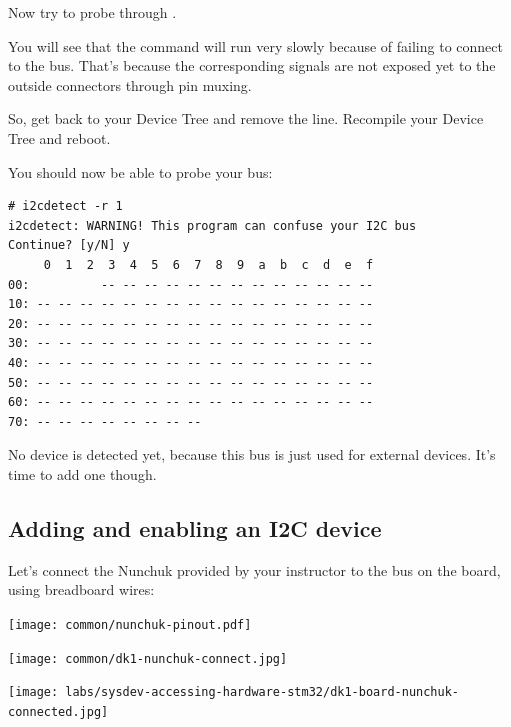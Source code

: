 Now try to probe \busname through .

You will see that the command will run very slowly because of failing to
connect to the bus. That's because the corresponding signals are
not exposed yet to the outside connectors through pin muxing.

So, get back to your Device Tree and remove the 
line. Recompile your Device Tree and reboot.

You should now be able to probe your bus:

\begin{verbatim}
# i2cdetect -r 1
i2cdetect: WARNING! This program can confuse your I2C bus
Continue? [y/N] y
     0  1  2  3  4  5  6  7  8  9  a  b  c  d  e  f
00:          -- -- -- -- -- -- -- -- -- -- -- -- --
10: -- -- -- -- -- -- -- -- -- -- -- -- -- -- -- --
20: -- -- -- -- -- -- -- -- -- -- -- -- -- -- -- --
30: -- -- -- -- -- -- -- -- -- -- -- -- -- -- -- --
40: -- -- -- -- -- -- -- -- -- -- -- -- -- -- -- --
50: -- -- -- -- -- -- -- -- -- -- -- -- -- -- -- --
60: -- -- -- -- -- -- -- -- -- -- -- -- -- -- -- --
70: -- -- -- -- -- -- -- --
\end{verbatim}

No device is detected yet, because this bus is just
used for external devices. It's time to add one though.

\subsection{Adding and enabling an I2C device}

Let's connect the Nunchuk provided by your instructor
to the \busname bus on the board, using breadboard wires:

\begin{center}
\texttt{[image: common/nunchuk-pinout.pdf]}
\end{center}

\if{}
\texttt{[image: common/dk1-nunchuk-connect.jpg]}
\begin{center}
  \texttt{[image: labs/sysdev-accessing-hardware-stm32/dk1-board-nunchuk-connected.jpg]}
\end{center}

